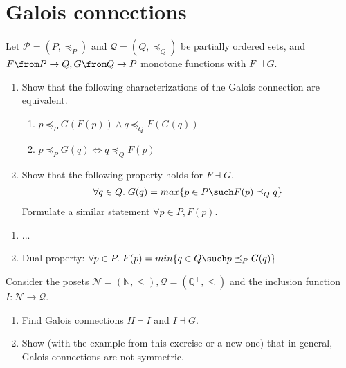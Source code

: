 \def\pathToRoot{../../}


\author {Sarah Mameche}
\section{Galois connections}


\begin{exercise}
Let $\mathscr{P} = (P, \preceq_P)$ and $\mathscr{Q} = (Q, \preceq_Q)$ be partially ordered sets, and $F \from P \to Q, G \from Q \to P$ monotone functions with $F \dashv G$.
\begin{enumerate}
\item Show that the following characterizations of the Galois connection are equivalent.
\begin{enumerate}
\item $p \preceq_P G (F (p)) \land q \preceq_Q F(G (q))$
\item $p \preceq_P G(q) \Leftrightarrow q \preceq_Q F(p)$
\end{enumerate}
\item Show that the following property holds for $F \dashv G$.
\[
\begin{aligned}
 \forall q \in Q.\; G(q) = max\{p \in P \such F(p) \preceq_Q q\}
\end{aligned}
\]
Formulate a similar statement $ \forall p \in P, F(p)$.
\end{enumerate}
\end{exercise}

\begin{answer}
\begin{enumerate}
\item ...
\item %
Dual property: $\forall p \in P.\; F(p) = min\{q \in Q \such p \preceq_P G(q)\} $
\end{enumerate}
\end{answer}


\begin{exercise}
Consider the posets $\mathscr{N} = (\mathbb{N}, \leqslant), \mathscr{Q} = (\mathbb{Q}^+, \leqslant)$
and the inclusion function $I : \mathscr{N} \to  \mathscr{Q}$.
\begin{enumerate}
\item Find Galois connections $H \dashv I$ and $I \dashv G$.
\item Show (with the example from this exercise or a new one) that in general, Galois connections are not symmetric.
\end{enumerate}
\end{exercise}

